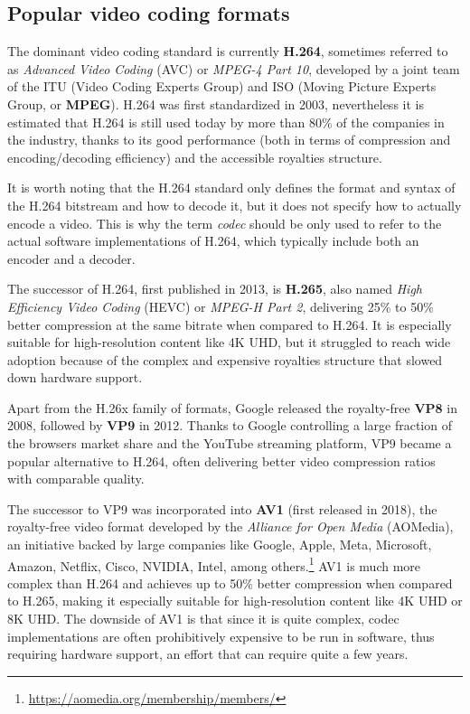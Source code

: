 \subsection{Popular video coding formats}
\label{sec:bg/compression/codecs}

The dominant video coding standard is currently \textbf{H.264}, sometimes referred to as \textit{Advanced Video Coding} (AVC) or \textit{MPEG-4 Part 10}, developed by a joint team of the ITU (Video Coding Experts Group) and ISO (Moving Picture Experts Group, or \textbf{MPEG}). H.264 was first standardized in 2003, nevertheless it is estimated that H.264 is still used today by more than 80\% of the companies in the industry, thanks to its good performance (both in terms of compression and encoding/decoding efficiency) and the accessible royalties structure.\cite{bitmovin}

It is worth noting that the H.264 standard only defines the format and syntax of the H.264 bitstream and how to decode it, but it does not specify how to actually encode a video. This is why the term \textit{codec} should be only used to refer to the actual software implementations of H.264, which typically include both an encoder and a decoder.

The successor of H.264, first published in 2013, is \textbf{H.265}, also named \textit{High Efficiency Video Coding} (HEVC) or \textit{MPEG-H Part 2}, delivering 25\% to 50\% better compression at the same bitrate when compared to H.264. It is especially suitable for high-resolution content like 4K UHD, but it struggled to reach wide adoption because of the complex and expensive royalties structure that slowed down hardware support.\cite{hevcroyalties}

Apart from the H.26x family of formats, Google released the royalty-free \textbf{VP8} in 2008, followed by \textbf{VP9} in 2012. Thanks to Google controlling a large fraction of the browsers market share and the YouTube streaming platform, VP9 became a popular alternative to H.264, often delivering better video compression ratios with comparable quality.


The successor to VP9 was incorporated into \textbf{AV1} (first released in 2018), the royalty-free video format developed by the \textit{Alliance for Open Media} (AOMedia), an initiative backed by large companies like Google, Apple, Meta, Microsoft, Amazon, Netflix, Cisco, NVIDIA, Intel, among others.\footnote{\url{https://aomedia.org/membership/members/}} AV1 is much more complex than H.264 and achieves up to 50\% better compression when compared to H.265, making it especially suitable for high-resolution content like 4K UHD or 8K UHD. The downside of AV1 is that since it is quite complex, codec implementations are often prohibitively expensive to be run in software, thus requiring hardware support, an effort that can require quite a few years.

